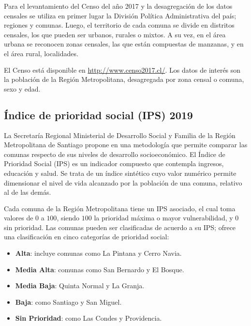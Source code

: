 Para el levantamiento del Censo del año 2017 y la desagregación de los datos censales se utiliza en primer lugar la División Política Administrativa del país; regiones y comunas. Luego, el territorio de cada comuna se divide en distritos censales, los que pueden ser urbanos, rurales o mixtos. A su vez, en el área urbana se reconocen zonas censales, las que están compuestas de manzanas, y en el área rural, localidades.

El Censo está disponible en \url{http://www.censo2017.cl/}. Los datos de interés son la población de la Región Metropolitana, desagregada por zona censal o comuna, sexo y edad.


\subsection{\'Indice de prioridad social (IPS) 2019}\label{sec:ips}


La Secretaría Regional Ministerial de Desarrollo Social y Familia de la Región Metropolitana de Santiago propone en \cite{SEREMIRM2019} una metodología que permite comparar las comunas respecto de sus niveles de desarrollo socioeconómico. El Índice de Prioridad Social (IPS) es un indicador compuesto que contempla ingresos, educación y salud. Se trata de un índice sintético cuyo valor numérico permite dimensionar el nivel de vida alcanzado por la población de una comuna, relativo al de las demás. 

Cada comuna de la Región Metropolitana tiene un IPS asociado, el cual toma valores de \(0\) a \(100\), siendo \(100\) la prioridad máxima o mayor vulnerabilidad, y \(0\) sin prioridad. Las comunas pueden ser clasificadas de acuerdo a su IPS; \cite{SEREMIRM2019} ofrece una clasificación en cinco categorías de prioridad social:

\begin{itemize}
\item \textbf{Alta}: incluye comunas como La Pintana y Cerro Navia.
\item \textbf{Media Alta}: comunas como San Bernardo y El Bosque.
\item \textbf{Media Baja}: Quinta Normal y La Granja.
\item \textbf{Baja}: como Santiago y San Miguel.
\item \textbf{Sin Prioridad}: como Las Condes y Providencia.
\end{itemize}

